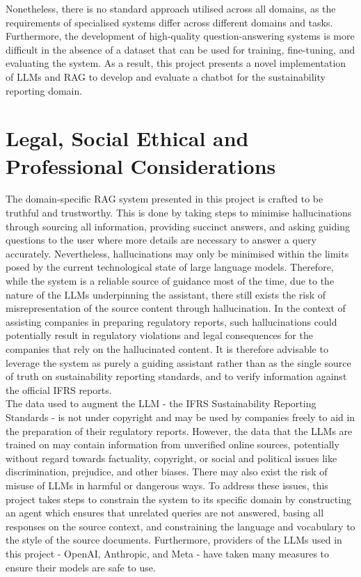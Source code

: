 Nonetheless, there is no standard approach utilised across all domains, as the requirements of specialised systems differ across different domains and tasks. Furthermore, the development of high-quality question-answering systems is more difficult in the absence of a dataset that can be used for training, fine-tuning, and evaluating the system. As a result, this project presents a novel implementation of LLMs and RAG to develop and evaluate a chatbot for the sustainability reporting domain.


\section{Legal, Social Ethical and Professional Considerations }

The domain-specific RAG system presented in this project is crafted to be truthful and trustworthy. This is done by taking steps to minimise hallucinations through sourcing all information, providing succinct answers, and asking guiding questions to the user where more details are necessary to answer a query accurately. Nevertheless, hallucinations may only be minimised within the limits posed by the current technological state of large language models. Therefore, while the system is a reliable source of guidance most of the time, due to the nature of the LLMs underpinning the assistant, there still exists the risk of misrepresentation of the source content through hallucination. In the context of assisting companies in preparing regulatory reports, such hallucinations could potentially result in regulatory violations and legal consequences for the companies that rely on the hallucinated content. It is therefore advisable to leverage the system as purely a guiding assistant rather than as the single source of truth on sustainability reporting standards, and to verify information against the official IFRS reports. \\

The data used to augment the LLM - the IFRS Sustainability Reporting Standards - is not under copyright and may be used by companies freely to aid in the preparation of their regulatory reports. However, the data that the LLMs are trained on may contain information from unverified online sources, potentially without regard towards factuality, copyright, or social and political issues like discrimination, prejudice, and other biases. There may also exist the risk of misuse of LLMs in harmful or dangerous ways. To address these issues, this project takes steps to constrain the system to its specific domain by constructing an agent which ensures that unrelated queries are not answered, basing all responses on the source context, and constraining the language and vocabulary to the style of the source documents. Furthermore, providers of the LLMs used in this project - OpenAI, Anthropic, and Meta - have taken many measures to ensure their models are safe to use.\\

